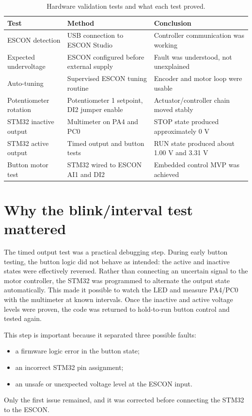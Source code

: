 \documentclass[11pt,a4paper]{report}
\begin{document}
\begin{table}[H]
\centering
\caption{Hardware validation tests and what each test proved.}
\begin{tabular}{p{}p{}p{}}
\toprule
Test & Method & Conclusion\\
\midrule
ESCON detection & USB connection to ESCON Studio & Controller communication was working\\
Expected undervoltage & ESCON configured before external supply & Fault was understood, not unexplained\\
Auto-tuning & Supervised ESCON tuning routine & Encoder and motor loop were usable\\
Potentiometer rotation & Potentiometer 1 setpoint, DI2 jumper enable & Actuator/controller chain moved stably\\
STM32 inactive output & Multimeter on PA4 and PC0 & STOP state produced approximately 0 V\\
STM32 active output & Timed output and button tests & RUN state produced about 1.00 V and 3.31 V\\
Button motor test & STM32 wired to ESCON AI1 and DI2 & Embedded control MVP was achieved\\
\bottomrule
\end{tabular}
\end{table}

\section{Why the blink/interval test mattered}

The timed output test was a practical debugging step. During early button testing, the button logic did not behave as intended: the active and inactive states were effectively reversed. Rather than connecting an uncertain signal to the motor controller, the STM32 was programmed to alternate the output state automatically. This made it possible to watch the LED and measure PA4/PC0 with the multimeter at known intervals. Once the inactive and active voltage levels were proven, the code was returned to hold-to-run button control and tested again.

This step is important because it separated three possible faults:
\begin{itemize}
  \item a firmware logic error in the button state;
  \item an incorrect STM32 pin assignment;
  \item an unsafe or unexpected voltage level at the ESCON input.
\end{itemize}
Only the first issue remained, and it was corrected before connecting the STM32 to the ESCON.
\end{document}
